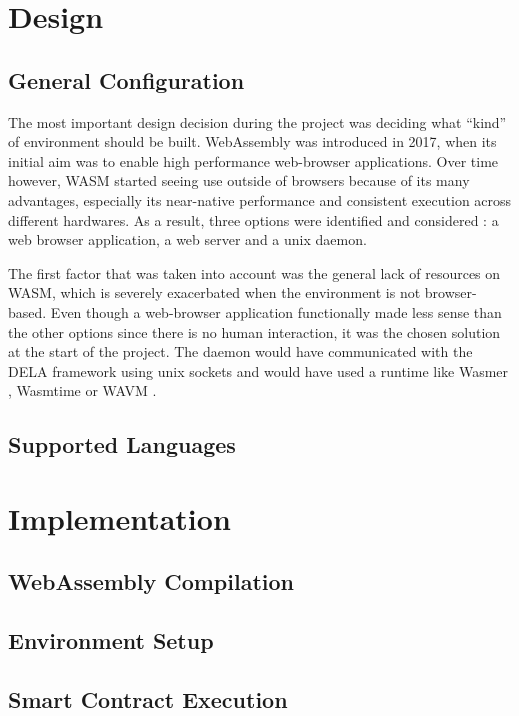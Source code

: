 \documentclass[11pt, a4paper, twoside, openright]{article}
\begin{document}
\section{Design}

\subsection{General Configuration}
The most important design decision during the project was deciding what ``kind'' of environment should be built. WebAssembly was introduced in 2017, when its initial aim was to enable high performance web-browser applications. Over time however, WASM started seeing use outside of browsers because of its many advantages, especially its near-native performance and consistent execution across different hardwares. As a result, three options were identified and considered : a web browser application, a web server and a unix daemon.

The first factor that was taken into account was the general lack of resources on WASM, which is severely exacerbated when the environment is not browser-based. Even though a web-browser application functionally made less sense than the other options since there is no human interaction, it was the chosen solution at the start of the project. The daemon would have communicated with the DELA framework using unix sockets and would have used a runtime like Wasmer \cite{wasmer}, Wasmtime \cite{wasmtime} or WAVM \cite{wavm}.
\subsection{Supported Languages}


\section{Implementation}

\subsection{WebAssembly Compilation}

\subsection{Environment Setup}

\subsection{Smart Contract Execution}
\end{document}
